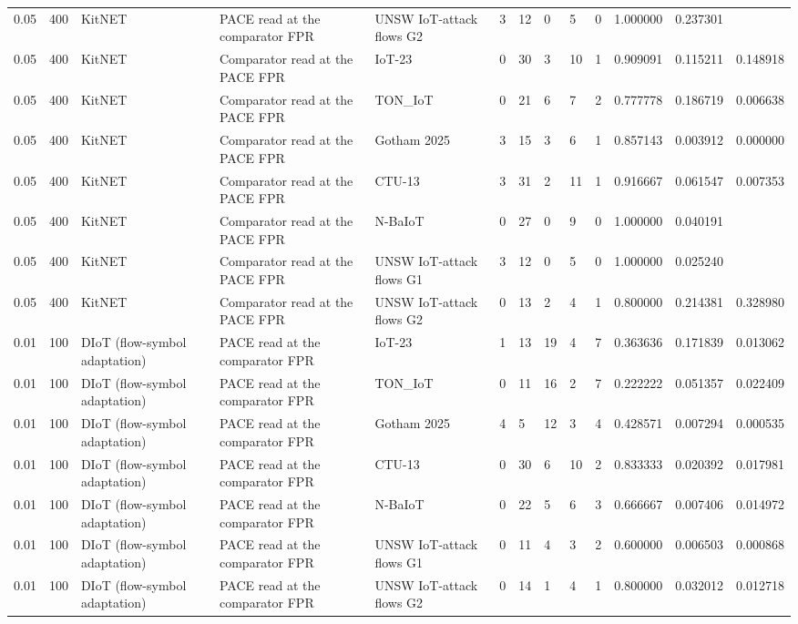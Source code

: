 \begin{tabular}{lllllllllllll}
0.05 & 400 & KitNET & PACE read at the comparator FPR & UNSW IoT-attack flows G2 & 3 & 12 & 0 & 5 & 0 & 1.000000 & 0.237301 &  \\
0.05 & 400 & KitNET & Comparator read at the PACE FPR & IoT-23 & 0 & 30 & 3 & 10 & 1 & 0.909091 & 0.115211 & 0.148918 \\
0.05 & 400 & KitNET & Comparator read at the PACE FPR & TON\_IoT & 0 & 21 & 6 & 7 & 2 & 0.777778 & 0.186719 & 0.006638 \\
0.05 & 400 & KitNET & Comparator read at the PACE FPR & Gotham 2025 & 3 & 15 & 3 & 6 & 1 & 0.857143 & 0.003912 & 0.000000 \\
0.05 & 400 & KitNET & Comparator read at the PACE FPR & CTU-13 & 3 & 31 & 2 & 11 & 1 & 0.916667 & 0.061547 & 0.007353 \\
0.05 & 400 & KitNET & Comparator read at the PACE FPR & N-BaIoT & 0 & 27 & 0 & 9 & 0 & 1.000000 & 0.040191 &  \\
0.05 & 400 & KitNET & Comparator read at the PACE FPR & UNSW IoT-attack flows G1 & 3 & 12 & 0 & 5 & 0 & 1.000000 & 0.025240 &  \\
0.05 & 400 & KitNET & Comparator read at the PACE FPR & UNSW IoT-attack flows G2 & 0 & 13 & 2 & 4 & 1 & 0.800000 & 0.214381 & 0.328980 \\
0.01 & 100 & DIoT (flow-symbol adaptation) & PACE read at the comparator FPR & IoT-23 & 1 & 13 & 19 & 4 & 7 & 0.363636 & 0.171839 & 0.013062 \\
0.01 & 100 & DIoT (flow-symbol adaptation) & PACE read at the comparator FPR & TON\_IoT & 0 & 11 & 16 & 2 & 7 & 0.222222 & 0.051357 & 0.022409 \\
0.01 & 100 & DIoT (flow-symbol adaptation) & PACE read at the comparator FPR & Gotham 2025 & 4 & 5 & 12 & 3 & 4 & 0.428571 & 0.007294 & 0.000535 \\
0.01 & 100 & DIoT (flow-symbol adaptation) & PACE read at the comparator FPR & CTU-13 & 0 & 30 & 6 & 10 & 2 & 0.833333 & 0.020392 & 0.017981 \\
0.01 & 100 & DIoT (flow-symbol adaptation) & PACE read at the comparator FPR & N-BaIoT & 0 & 22 & 5 & 6 & 3 & 0.666667 & 0.007406 & 0.014972 \\
0.01 & 100 & DIoT (flow-symbol adaptation) & PACE read at the comparator FPR & UNSW IoT-attack flows G1 & 0 & 11 & 4 & 3 & 2 & 0.600000 & 0.006503 & 0.000868 \\
0.01 & 100 & DIoT (flow-symbol adaptation) & PACE read at the comparator FPR & UNSW IoT-attack flows G2 & 0 & 14 & 1 & 4 & 1 & 0.800000 & 0.032012 & 0.012718 \\

\end{tabular}
